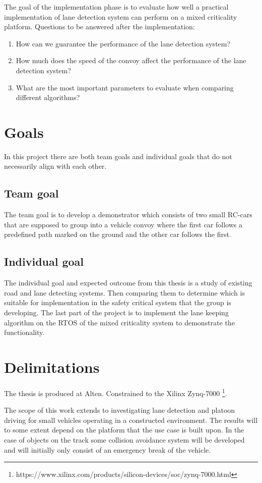 The goal of the implementation phase is to evaluate how well a practical implementation of lane detection system can perform on a mixed criticality platform. Questions to be answered after the implementation:

\begin{enumerate}  
\item How can we guarantee the performance of the lane detection system?
\item How much does the speed of the convoy affect the performance of the lane detection system?
\item What are the most important parameters to evaluate when comparing different algorithms?
\end{enumerate}

\section{Goals}
In this project there are both team goals and individual goals that do not necessarily align with each other.

\subsection{Team goal}
The team goal is to develop a demonstrator which consists of two small RC-cars that are supposed to group into a vehicle convoy where the first car follows a predefined path marked on the ground and the other car follows the first.

\subsection{Individual goal}
The individual goal and expected outcome from this thesis is a study of existing road and lane detecting systems. Then comparing them to determine which is suitable for implementation in the safety critical system that the group is developing. The last part of the project is to implement the lane keeping algorithm on the RTOS of the mixed criticality system to demonstrate the functionality.

\section{Delimitations}
The thesis is produced at Alten.
Constrained to the Xilinx Zynq-7000 \footnote{https://www.xilinx.com/products/silicon-devices/soc/zynq-7000.html}.

The scope of this work extends to investigating lane detection and platoon driving for small vehicles operating in a constructed environment. The results will to some extent depend on the platform that the use case is built upon. In the case of objects on the track some collision avoidance system will be developed and will initially only consist of an emergency break of the vehicle.


